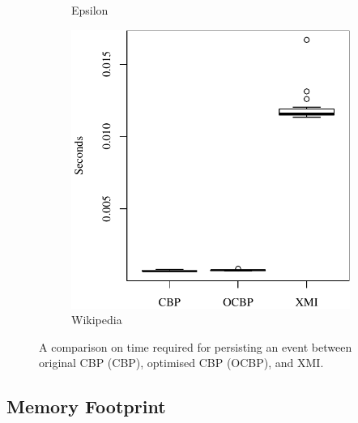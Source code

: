 \documentclass{llncs}
\begin{document}
{\begin{figure}[t]
\begin{subfigure}{0.325\textwidth}
            \caption{Epsilon}
            \label{fig:save_time_epsilon}
        \end{subfigure}
        \hfill
        \begin{subfigure}{0.325\textwidth}
            \centering
            \includegraphics[width=\linewidth]{images/save_time_wikipedia}
            \caption{Wikipedia}
            \label{fig:save_time_wikipedia}
        \end{subfigure}
        \caption{A comparison on time required for persisting an event between original CBP (CBP), optimised CBP (OCBP), and XMI.}
        \label{fig:savetime}
    \end{figure}
    
    
    \vspace{-10pt}
    \subsection{Memory Footprint}
    \label{subsec:memory_consumption}
    

}
\end{document}

